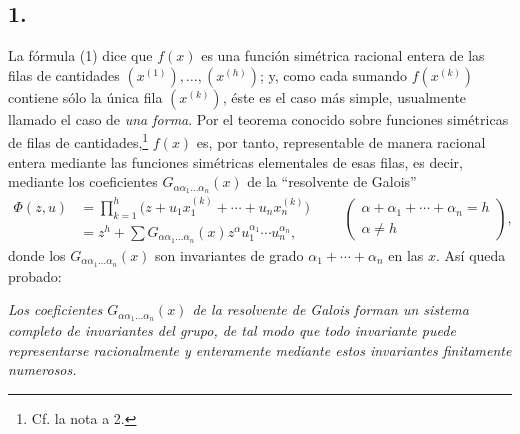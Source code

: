 \documentclass[11pt]{article}
\begin{document}
\subsection*{1.}
La fórmula (1) dice que $f(x)$ es una función simétrica racional entera de las filas de cantidades $(x^{(1)}),
\ldots,(x^{(h)})$; y, como cada sumando $f(x^{(k)})$ contiene sólo la única fila $(x^{(k)})$, éste es el caso más simple, usualmente llamado el caso de \emph{una forma}. Por el teorema conocido sobre funciones simétricas de filas de cantidades,\footnote{Cf. la nota a 2.} $f(x)$ es, por tanto, representable de manera racional entera mediante las funciones simétricas elementales de esas filas, es decir, mediante los coeficientes $G_{\alpha\alpha_1\ldots\alpha_n}(x)$ de la ``resolvente de Galois''
\[
\begin{aligned}
  \Phi(z,u)
  &=\prod_{k=1}^{h}\bigl(z+u_1x_1^{(k)}+\cdots+u_nx_n^{(k)}\bigr) \\
  &=z^h+
    \sum G_{\alpha\alpha_1\ldots\alpha_n}(x)
    z^{\alpha}u_1^{\alpha_1}\cdots u_n^{\alpha_n},
\end{aligned}
\qquad
\left(\begin{array}{c}
\alpha+\alpha_1+
\cdots+
\alpha_n=h\\
\alpha\ne h
\end{array}\right),
\]
donde los $G_{\alpha\alpha_1\ldots\alpha_n}(x)$ son invariantes de grado $\alpha_1+\cdots+\alpha_n$ en las $x$. Así queda probado:

\emph{Los coeficientes $G_{\alpha\alpha_1\ldots\alpha_n}(x)$ de la resolvente de Galois forman un sistema completo de invariantes del grupo, de tal modo que todo invariante puede representarse racionalmente y enteramente mediante estos invariantes finitamente numerosos.}
\end{document}
